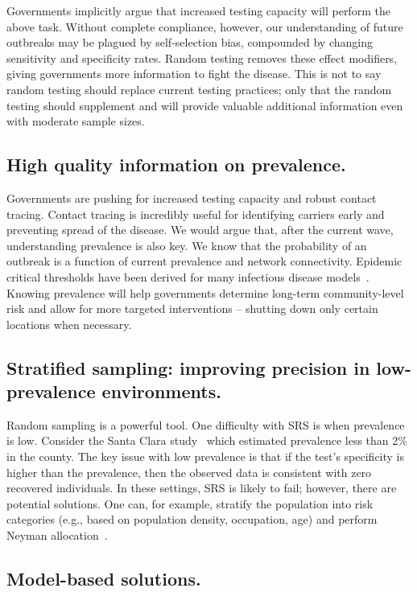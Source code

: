\documentclass[12pt]{amsart}
\numberwithin{equation}{section}
\theoremstyle{plain}
\begin{document}
Governments implicitly argue that increased testing capacity will perform the above task.  Without complete compliance, however, our understanding of future outbreaks may be plagued by self-selection bias, compounded by changing sensitivity and specificity rates. Random testing removes these effect modifiers, giving governments more information to fight the disease.  This is not to say random testing should replace current testing practices; only that the random testing should supplement and will provide valuable additional information even with moderate sample sizes.

\subsection*{High quality information on prevalence.}

Governments are pushing for increased testing capacity and robust contact tracing.  Contact tracing is incredibly useful for identifying carriers early and preventing spread of the disease.  We would argue that, after the current wave, understanding prevalence is also key.  We know that the probability of an outbreak is a function of current prevalence and network connectivity.  Epidemic critical thresholds have been derived for many infectious disease models~\citep{Pastor2001,Newman2002,Parshani2010}.  Knowing prevalence will help governments determine long-term community-level risk and allow for more targeted interventions -- shutting down only certain locations when necessary.

\subsection*{Stratified sampling: improving precision in low-prevalence environments.}
Random sampling is a powerful tool.  One difficulty with SRS is when prevalence is low.  Consider the Santa Clara study~\citep{Bendavid2020} which estimated prevalence less than 2\% in the county.  The key issue with low prevalence is that if the test's specificity is higher than the prevalence, then the observed data is consistent with zero recovered individuals. In these settings, SRS is likely to fail; however, there are potential solutions.  One can, for example, stratify the population into risk categories (e.g., based on population density, occupation, age) and perform Neyman allocation~\citep{Cochran77}.

\subsection*{Model-based solutions.}
\end{document}
